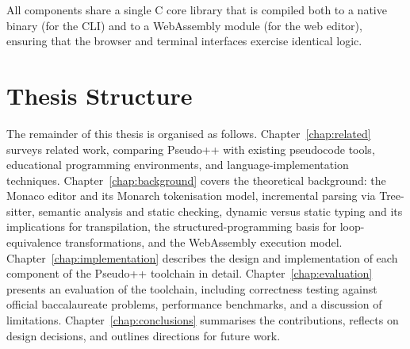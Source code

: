 All components share a single C core library that is compiled both to a
native binary (for the CLI) and to a WebAssembly module (for the web
editor), ensuring that the browser and terminal interfaces exercise
identical logic.

\section{Thesis Structure}
\label{sec:structure}

The remainder of this thesis is organised as follows.
Chapter~\ref{chap:related} surveys related work, comparing Pseudo++ with
existing pseudocode tools, educational programming environments, and
language-implementation techniques.
Chapter~\ref{chap:background} covers the theoretical background: the
Monaco editor and its Monarch tokenisation model, incremental parsing via
Tree-sitter, semantic analysis and static checking, dynamic versus static
typing and its implications for transpilation, the structured-programming
basis for loop-equivalence transformations, and the WebAssembly execution
model.
Chapter~\ref{chap:implementation} describes the design and implementation
of each component of the Pseudo++ toolchain in detail.
Chapter~\ref{chap:evaluation} presents an evaluation of the toolchain,
including correctness testing against official baccalaureate problems,
performance benchmarks, and a discussion of limitations.
Chapter~\ref{chap:conclusions} summarises the contributions, reflects on
design decisions, and outlines directions for future work.
